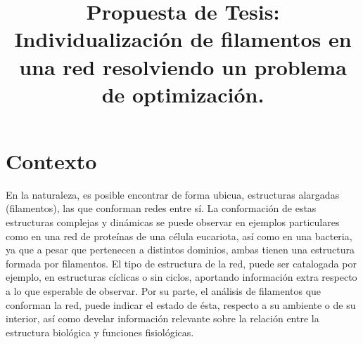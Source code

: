 \documentclass{article}
\title{Propuesta de Tesis: Individualizaci\'on de filamentos en una red resolviendo un problema de optimizaci\'on.}
\date{}
\begin{document}
\maketitle

\section{Contexto}
\label{contexto}

En la naturaleza, es posible encontrar de forma ubicua, estructuras alargadas (filamentos), las que conforman redes entre sí. La conformación de estas estructuras complejas y din\'amicas se puede observar en ejemplos particulares como en una red de prote\'inas de una c\'elula eucariota, as\'i como en una bacteria, ya que a pesar que pertenecen a distintos dominios, ambas tienen una estructura formada por filamentos. 
El tipo de estructura de la red, puede ser catalogada por ejemplo, en estructuras c\'iclicas o sin ciclos, aportando informaci\'on extra respecto a lo que esperable de observar. 
Por su parte, el análisis de filamentos que conforman la red, puede indicar el estado de \'esta, respecto a su ambiente o de su interior, as\'i como develar informaci\'on relevante sobre la relaci\'on entre la estructura biol\'ogica y funciones fisiol\'ogicas.  
  
\end{document}

